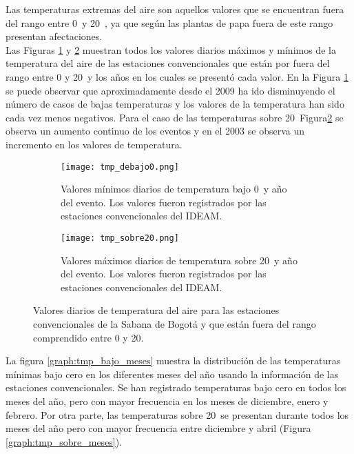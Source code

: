 Las temperaturas extremas del aire son aquellos valores que se encuentran fuera del rango entre 0\celc \  y 20\celc \ , ya que según \citet{Hijmans2003} las plantas de papa fuera de este rango presentan afectaciones.\\

Las Figuras \ref{graph:tmp_bajo0} y \ref{graph:tmp_sobre20} muestran todos los valores diarios máximos y mínimos de la temperatura del aire de las estaciones convencionales que están por fuera del rango entre 0 y 20\celc \  y los años en los cuales se presentó cada valor. En la Figura \ref{graph:tmp_bajo0} se puede observar que aproximadamente desde el 2009 ha ido disminuyendo el número de casos de bajas temperaturas y los valores de la temperatura han sido cada vez menos negativos. Para el caso de las temperaturas sobre 20\celc \ Figura\ref{graph:tmp_sobre20} se observa un aumento continuo de los eventos y en el 2003 se observa un incremento en los valores de temperatura.


\begin{figure}[H]
	\begin{subfigure}[b]{\linewidth}
	\begin{center}
		\caption{Valores mínimos diarios de temperatura bajo 0\celc \  y año del evento. Los valores fueron registrados por las estaciones convencionales del IDEAM.}	
	\texttt{[image: tmp\_debajo0.png]}
		\label{graph:tmp_bajo0}
		
	\end{center}
	\end{subfigure}
	
	\begin{subfigure}[b]{\linewidth}
	\begin{center}
		\caption{Valores máximos diarios de temperatura sobre 20\celc \  y año del evento. Los valores fueron registrados por las estaciones convencionales del IDEAM.}		
	\texttt{[image: tmp\_sobre20.png]}
		\label{graph:tmp_sobre20}
		
	\end{center}
	\end{subfigure}
	
	
	\caption{Valores diarios de temperatura del aire para las estaciones convencionales de la Sabana de Bogotá y que están fuera del rango comprendido entre 0 y 20\celc. }		
	\label{graph:limites}

\end{figure}

La figura \ref{graph:tmp_bajo_meses} muestra la distribución de las temperaturas mínimas bajo cero en los diferentes meses del año usando la información de las estaciones convencionales. Se han registrado temperaturas bajo cero en todos los meses del año, pero con mayor frecuencia en los meses de diciembre, enero y febrero. Por otra parte, las temperaturas sobre 20\celc \  se presentan durante todos los meses del año pero con mayor frecuencia entre diciembre y abril (Figura \ref{graph:tmp_sobre_meses}).


